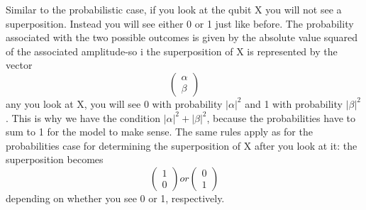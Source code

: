 Similar to the probabilistic case, if you look at the qubit X you will not see a superposition. Instead you will see either 0 or 1 just like before. The probability associated with the two possible outcomes is given by the absolute value squared of the associated amplitude-so i the superposition of X is represented by the vector
\[
\begin{pmatrix} \alpha \\ \beta \end{pmatrix}
\]
any you look at X, you will see 0 with probability $|\alpha|^2$ and 1 with probability $|\beta|^2$. This is why we have the condition $|\alpha|^2+|\beta|^2$, because the probabilities have to sum to 1 for the model to make sense. The same rules apply as for the probabilities case for determining the superposition of X after you look at it: the superposition becomes
\[
\begin{pmatrix} 1 \\ 0 \end{pmatrix} or \begin{pmatrix} 0 \\1 \end{pmatrix}
\]
depending on whether you see 0 or 1, respectively.

